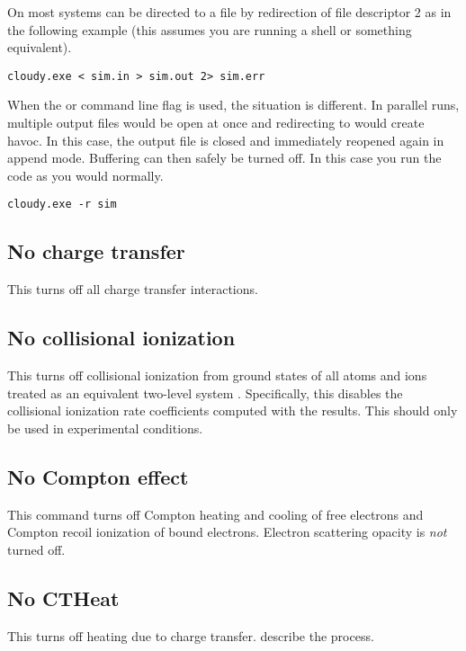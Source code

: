 On most systems  can be directed to a file by redirection of file descriptor 2 as in the following example
(this assumes you are running a  shell or something equivalent).
\begin{verbatim}
cloudy.exe < sim.in > sim.out 2> sim.err
\end{verbatim}
When the  or  command line flag is used, the
situation is different. In parallel runs, multiple output files would be open
at once and redirecting to  would create havoc. In this
case, the output file is closed and immediately reopened again in append mode.
Buffering can then safely be turned off. In this case you run the code as you
would normally.
\begin{verbatim}
cloudy.exe -r sim
\end{verbatim}

\subsection{No charge transfer}

This turns off all charge transfer interactions.

\subsection{No collisional ionization}

This turns off collisional ionization from ground states of all atoms
and ions treated as an equivalent two-level system \citep{2017RMxAA..53..385F}.
Specifically, this disables the collisional ionization rate coefficients computed
with the \citet{Voronov1997} results.  
This should only be used in experimental conditions.

\subsection{No Compton effect}

This command turns off Compton heating and cooling of free electrons
and Compton recoil ionization of bound electrons.
Electron scattering opacity is \emph{not} turned off.

\subsection{No CTHeat}

This turns off heating due to charge transfer.
\citet{KingdonFerland1999} describe the process.

